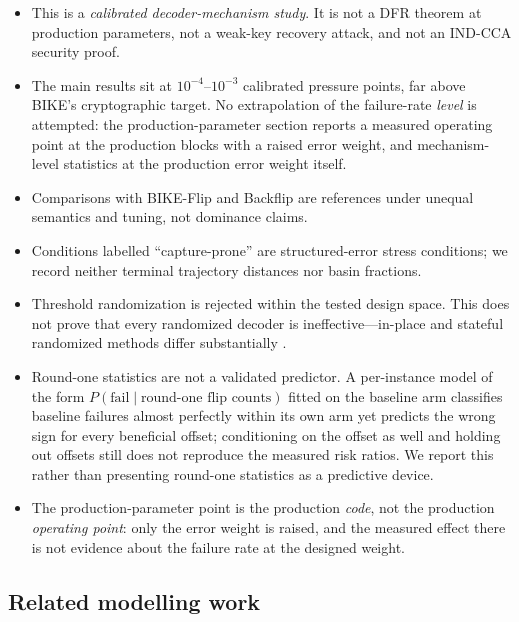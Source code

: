 \documentclass[lettersize,journal]{IEEEtran}
\begin{document}
\begin{itemize}[leftmargin=1.3em,itemsep=0.12em,topsep=0.2em]
\item This is a \emph{calibrated decoder-mechanism study}. It is not a DFR theorem at production parameters, not a weak-key recovery attack, and not an IND-CCA security proof.
\item The main results sit at $10^{-4}$--$10^{-3}$ calibrated pressure points, far above BIKE's cryptographic target. No extrapolation of the failure-rate \emph{level} is attempted: the production-parameter section reports a measured operating point at the production blocks with a raised error weight, and mechanism-level statistics at the production error weight itself.
\item Comparisons with BIKE-Flip and Backflip are references under unequal semantics and tuning, not dominance claims.
\item Conditions labelled ``capture-prone'' are structured-error stress conditions; we record neither terminal trajectory distances nor basin fractions.
\item Threshold randomization is rejected within the tested design space. This does not prove that every randomized decoder is ineffective---in-place and stateful randomized methods differ substantially \cite{baldi2021inplace}.
\item Round-one statistics are not a validated predictor. A per-instance model of the form $P(\text{fail}\mid\text{round-one flip counts})$ fitted on the baseline arm classifies baseline failures almost perfectly within its own arm yet predicts the wrong sign for every beneficial offset; conditioning on the offset as well and holding out offsets still does not reproduce the measured risk ratios. We report this rather than presenting round-one statistics as a predictive device.
\item The production-parameter point is the production \emph{code}, not the production \emph{operating point}: only the error weight is raised, and the measured effect there is not evidence about the failure rate at the designed weight.
\end{itemize}

\subsection{Related modelling work}
\end{document}
